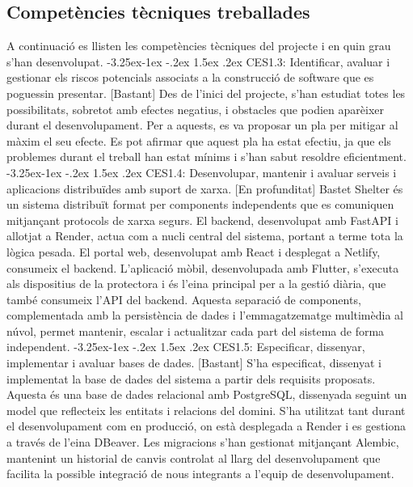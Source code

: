 \documentclass[11pt,a4paper]{report}
\makeatletter
\renewcommand\paragraph{\@startsection{paragraph}{4}{\z@}%
    {-3.25ex\@plus -1ex \@minus -.2ex}%
    {1.5ex \@plus .2ex}
    {\normalfont\normalsize\bfseries}}
\makeatother
\begin{document}
\subsection{Competències tècniques treballades}
A continuació es llisten les competències tècniques del projecte i en quin grau s'han desenvolupat.
\paragraph{CES1.3: Identificar, avaluar i gestionar els riscos potencials associats a la construcció de software que es poguessin presentar. [Bastant]}
Des de l'inici del projecte, s'han estudiat totes les possibilitats, sobretot amb efectes negatius, i obstacles que podien aparèixer durant el desenvolupament. Per a aquests, es va proposar un pla per mitigar al màxim el seu efecte. Es pot afirmar que aquest pla ha estat efectiu, ja que els problemes durant el treball han estat mínims i s'han sabut resoldre eficientment.
\paragraph{CES1.4: Desenvolupar, mantenir i avaluar serveis i aplicacions distribuïdes amb suport de xarxa. [En profunditat]}
Bastet Shelter és un sistema distribuït format per components independents que es comuniquen mitjançant protocols de xarxa segurs. El backend, desenvolupat amb FastAPI i allotjat a Render, actua com a nucli central del sistema, portant a terme tota la lògica pesada. El portal web, desenvolupat amb React i desplegat a Netlify, consumeix el backend. L'aplicació mòbil, desenvolupada amb Flutter, s'executa als dispositius de la protectora i és l'eina principal per a la gestió diària, que també consumeix l'API del backend. Aquesta separació de components, complementada amb la persistència de dades i l'emmagatzematge multimèdia al núvol, permet mantenir, escalar i actualitzar cada part del sistema de forma independent. 
\paragraph{CES1.5: Especificar, dissenyar, implementar i avaluar bases de dades. [Bastant]}
S'ha especificat, dissenyat i implementat la base de dades del sistema a partir dels requisits proposats. Aquesta és una base de dades relacional amb PostgreSQL, dissenyada seguint un model que reflecteix les entitats i relacions del domini. S'ha utilitzat tant durant el desenvolupament com en producció, on està desplegada a Render i es gestiona a través de l'eina DBeaver. Les migracions s'han gestionat mitjançant Alembic, mantenint un historial de canvis controlat al llarg del desenvolupament que facilita la possible integració de nous integrants a l'equip de desenvolupament.
\end{document}
